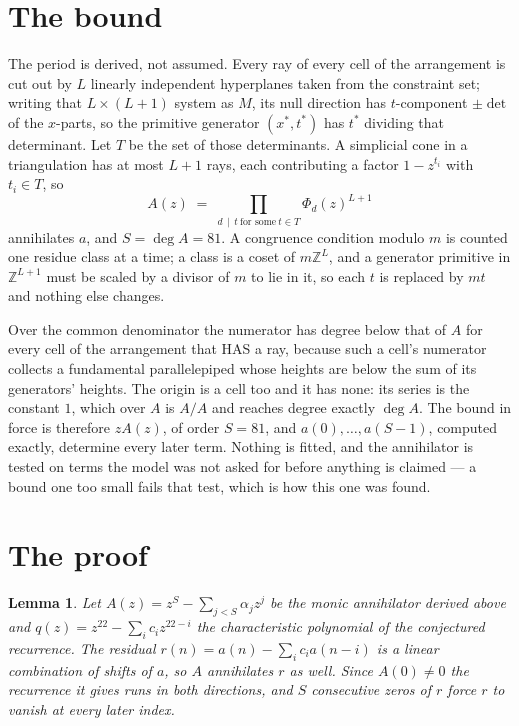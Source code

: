 \documentclass[11pt,a4paper]{article}
\theoremstyle{plain}
\newtheorem{lemma}[theorem]{Lemma}
\theoremstyle{definition}
\begin{document}
\section{The bound}

The period is derived, not assumed. Every ray of every cell of the arrangement is cut out by
$L$ linearly independent hyperplanes taken from the constraint set; writing that $L\times(L+1)$
system as $M$, its null direction has $t$-component $\pm\det$ of the $x$-parts, so the
primitive generator $(x^*,t^*)$ has $t^*$ dividing that determinant. Let $T$ be the set of
those determinants. A simplicial cone in a triangulation has at most $L+1$ rays, each
contributing a factor $1-z^{t_i}$ with $t_i\in T$, so
\[
A(z)\;=\;\prod_{d\,\mid\,t\ \text{for some}\ t\in T}\Phi_d(z)^{L+1}
\]
annihilates $a$, and $S=\deg A=81$. A congruence condition modulo $m$ is counted one residue
class at a time; a class is a coset of $m\mathbb{Z}^L$, and a generator primitive in
$\mathbb{Z}^{L+1}$ must be scaled by a divisor of $m$ to lie in it, so each $t$ is replaced
by $mt$ and nothing else changes.

Over the common denominator the numerator has degree below that of $A$ for every cell of the
arrangement that HAS a ray, because such a cell's numerator collects a fundamental
parallelepiped whose heights are below the sum of its generators' heights. The origin is a cell
too and it has none: its series is the constant $1$, which over $A$ is $A/A$ and reaches degree
exactly $\deg A$. The bound in force is therefore $zA(z)$, of order $S=81$, and
$a(0),\dots,a(S-1)$, computed exactly, determine every later term. Nothing is fitted, and the
annihilator is tested on terms the model was not asked for before anything is claimed --- a
bound one too small fails that test, which is how this one was found.

\section{The proof}

\begin{lemma}\label{lem:crit}
Let $A(z)=z^S-\sum_{j<S}\alpha_jz^{j}$ be the monic annihilator derived above and
$q(z)=z^{22}-\sum_ic_iz^{22-i}$ the characteristic polynomial of the conjectured
recurrence. The residual $r(n)=a(n)-\sum_ic_ia(n-i)$ is a linear combination of shifts of $a$,
so $A$ annihilates $r$ as well. Since $A(0)\ne0$ the recurrence it gives runs in both
directions, and $S$ consecutive zeros of $r$ force $r$ to vanish at every later index.
\end{lemma}
\end{document}
